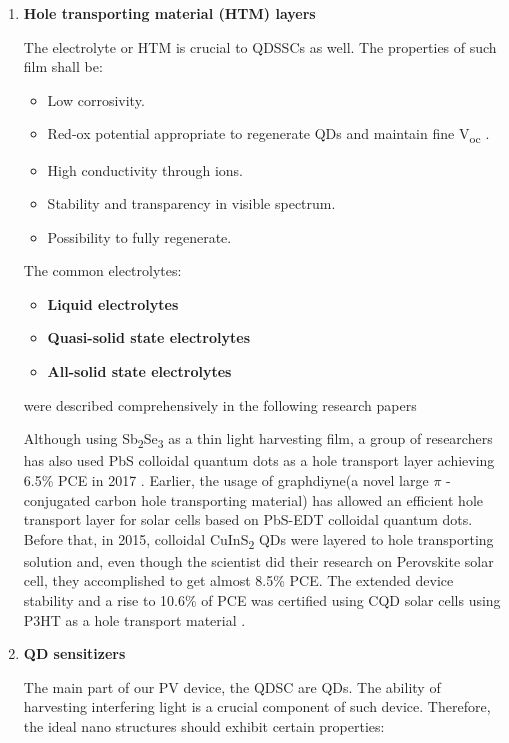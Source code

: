 \begin{enumerate}
\item \textbf{Hole transporting material (HTM) layers}

The electrolyte or HTM is crucial to QDSSCs as well. The properties of
such film shall be:

\begin{itemize}
\item
  Low corrosivity.
\item
  Red-ox potential appropriate to regenerate QDs and maintain fine
  V\textsubscript{oc} .
\item
  High conductivity through ions.
\item
  Stability and transparency in visible spectrum.
\item
  Possibility to fully regenerate. \cite{HuashangRao2018}
\end{itemize}

The common electrolytes:

\begin{itemize}
\item
  \textbf{Liquid electrolytes}
\item
  \textbf{Quasi-solid state electrolytes}
\item
  \textbf{All-solid state electrolytes}
\end{itemize}

were described comprehensively in the following research papers \cite{HuashangRao2018} \cite{Zhang2015} \cite{Song2017}

Although using Sb\textsubscript{2}Se\textsubscript{3} as a thin light
harvesting film, a group of researchers has also used PbS colloidal
quantum dots as a hole transport layer achieving 6.5\% PCE in 2017 \cite{Wang2017}. Earlier, the usage of graphdiyne(a novel large $\pi$ -conjugated carbon hole transporting material) has allowed an efficient hole transport layer for solar cells based on PbS-EDT colloidal quantum dots\cite{MingjianYuan2016}. Before that, in 2015, colloidal CuInS\textsubscript{2} QDs were layered to hole transporting solution and, even though the scientist did their research on Perovskite solar cell, they accomplished to get almost 8.5\% PCE\cite{JunZhu2015}. The extended device stability and a rise to 10.6\% of PCE was certified using CQD solar cells using P3HT as a hole transport material \cite{Zhang2016}.

\newpage
\item \textbf{QD sensitizers }

The main part of our PV device, the QDSC are QDs. The ability of harvesting interfering light is a crucial component of such device. \cite{Ikeda2014} Therefore, the ideal nano structures should exhibit certain properties:


\end{enumerate}
